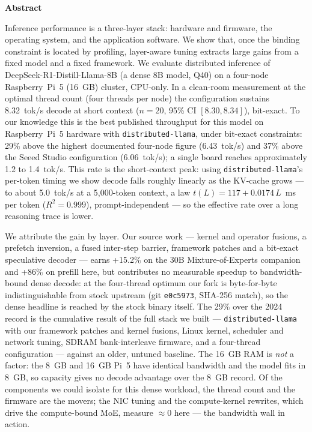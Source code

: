 \documentclass[10pt,a4paper]{article}
\renewenvironment{abstract}{%
  \vspace{2pt}\begin{center}\textbf{Abstract}\end{center}\par\vspace{1pt}%
  \begingroup\small\setlength{\leftskip}{1.8em}\setlength{\rightskip}{1.8em}\noindent\ignorespaces
}{\par\endgroup\vspace{10pt}}
\begin{document}
\begin{abstract}
Inference performance is a three-layer stack: hardware and firmware, the operating system, and the application software. We show that, once the binding constraint is located by profiling, layer-aware tuning extracts large gains from a fixed model and a fixed framework. We evaluate distributed inference of DeepSeek-R1-Distill-Llama-8B (a dense 8B model, Q40) on a four-node Raspberry~Pi~5 (16~GB) cluster, CPU-only. In a clean-room measurement at the optimal thread count (four threads per node) the configuration sustains 8.32~tok/s decode at short context ($n{=}20$, 95\% CI $[8.30, 8.34]$), bit-exact. To our knowledge this is the best published throughput for this model on Raspberry~Pi~5 hardware with \texttt{distributed-llama}, under bit-exact constraints: 29\% above the highest documented four-node figure (6.43~tok/s) and 37\% above the Seeed Studio configuration (6.06~tok/s); a single board reaches approximately 1.2 to 1.4~tok/s. This rate is the short-context peak: using \texttt{distributed-llama}'s per-token timing we show decode falls roughly linearly as the KV-cache grows --- to about 5.0~tok/s at a 5{,}000-token context, a law $t(L){=}117{+}0.0174\,L$~ms per token ($R^2{=}0.999$), prompt-independent --- so the effective rate over a long reasoning trace is lower.

We attribute the gain by layer. Our source work --- kernel and operator fusions, a prefetch inversion, a fused inter-step barrier, framework patches and a bit-exact speculative decoder --- earns +15.2\% on the 30B Mixture-of-Experts companion and +86\% on prefill here, but contributes no measurable speedup to bandwidth-bound dense decode: at the four-thread optimum our fork is byte-for-byte indistinguishable from stock upstream (git \texttt{e0c5973}, SHA-256 match), so the dense headline is reached by the stock binary itself. The 29\% over the 2024 record is the cumulative result of the full stack we built --- \texttt{distributed-llama} with our framework patches and kernel fusions, Linux kernel, scheduler and network tuning, SDRAM bank-interleave firmware, and a four-thread configuration --- against an older, untuned baseline. The 16~GB RAM is \emph{not} a factor: the 8~GB and 16~GB Pi~5 have identical bandwidth and the model fits in 8~GB, so capacity gives no decode advantage over the 8~GB record. Of the components we could isolate for this dense workload, the thread count and the firmware are the movers; the NIC tuning and the compute-kernel rewrites, which drive the compute-bound MoE, measure $\approx$0 here --- the bandwidth wall in action.


\end{abstract}
\end{document}
